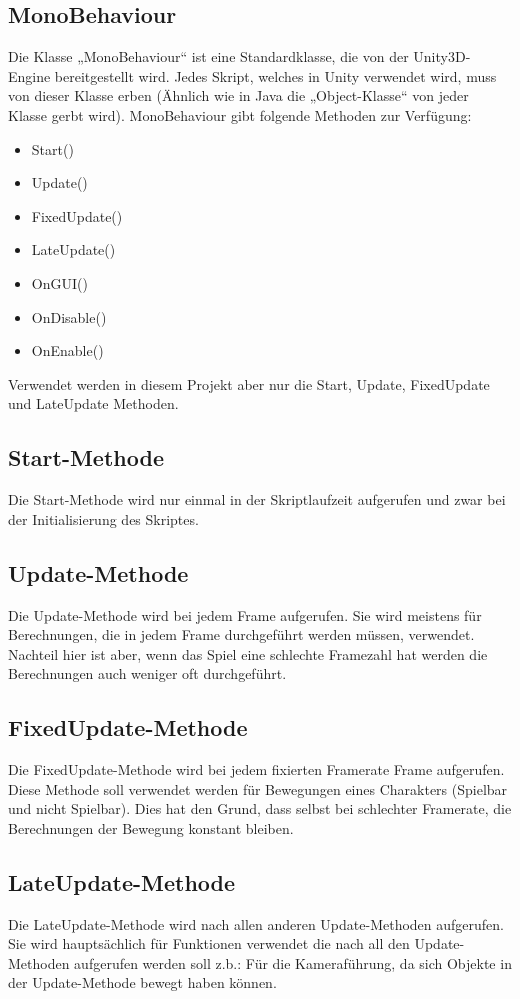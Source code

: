 \subsection{MonoBehaviour}	
Die Klasse „MonoBehaviour“ ist eine Standardklasse, die von der Unity3D-Engine bereitgestellt wird. Jedes Skript, welches in Unity verwendet wird, muss von dieser Klasse erben (Ähnlich wie in Java die „Object-Klasse“ von jeder Klasse gerbt wird). MonoBehaviour gibt folgende Methoden zur Verfügung:
\begin{itemize}
	\item Start()
	\item Update()
	\item FixedUpdate()
	\item LateUpdate()
	\item OnGUI()
	\item OnDisable()
	\item OnEnable()
\end{itemize}
Verwendet werden in diesem Projekt aber nur die Start, Update, FixedUpdate und LateUpdate Methoden.
\subsection{Start-Methode}
Die Start-Methode wird nur einmal in der Skriptlaufzeit aufgerufen und zwar bei der Initialisierung des Skriptes.
\subsection{Update-Methode}
Die Update-Methode wird bei jedem Frame aufgerufen. Sie wird meistens für Berechnungen, die in jedem Frame durchgeführt werden müssen, verwendet. Nachteil hier ist aber, wenn das Spiel eine schlechte Framezahl hat werden die Berechnungen auch weniger oft durchgeführt.
\subsection{FixedUpdate-Methode}
Die FixedUpdate-Methode wird bei jedem fixierten Framerate Frame aufgerufen. Diese Methode soll verwendet werden für Bewegungen eines Charakters (Spielbar und nicht Spielbar). Dies hat den Grund, dass selbst bei schlechter Framerate, die Berechnungen der Bewegung konstant bleiben.
\subsection{LateUpdate-Methode}
Die LateUpdate-Methode wird nach allen anderen Update-Methoden aufgerufen. Sie wird hauptsächlich für Funktionen verwendet die nach all den Update-Methoden aufgerufen werden soll z.b.: Für die Kameraführung, da sich Objekte in der Update-Methode bewegt haben können.
